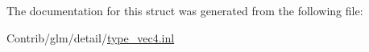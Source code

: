 The documentation for this struct was generated from the following file\+:\begin{DoxyCompactItemize}
\item 
Contrib/glm/detail/\mbox{\hyperlink{type__vec4_8inl}{type\+\_\+vec4.\+inl}}\end{DoxyCompactItemize}

